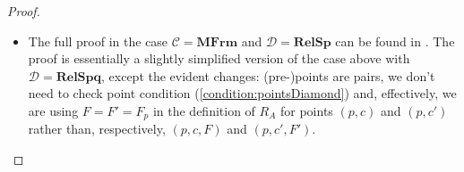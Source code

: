 \documentclass{article}[a4paper]
\theoremstyle{definition}
\newcommand{\Ccal}{\mathcal{C}} %
\newcommand{\Dcal}{\mathcal{D}} %
\newcommand{\relsp}{\mathbf{RelSp}}
\newcommand{\relspc}{\mathbf{RelSp^c}}
\newcommand{\relspq}{\mathbf{RelSpq}}
\newcommand{\mfrm}{\mathbf{MFrm}}
\DeclareMathOperator{\charop}{\nabla}
\begin{document}
\begin{proof}
\begin{itemize}
        Regarding the point condition (\ref{condition:pointsBox}), if $d \notin F'$, then $d \notin \charop(q_0)$ or  $d \notin F$. 
        If $d \notin \charop(q_0)$, then 
        $(q_0,e,G)$ provides the required witness.
        If $d \notin F$, then there is a point $(r,f,K)$ such that $(p,c,F) R_A (r,f,K)$ and $r(d) = 0$. 
        Then $r(c') \leq r(c) = 0$ and 
        $F' \subseteq F \subseteq \charop (r)$, so that $(p,c',F') R_A (r,f,K)$ and $(r,f,K)$ provides the witness.

        For the point condition (\ref{condition:pointsDiamond}), suppose $d \nleq c'$. Then $q_0 (d) = 1$ or $d \nleq c$. If $q_0 (d)=1$, then $(q_0,e,G)$ provides the required witness.
        If $d \nleq c$, then there is a point $(r,f,K)$ such that $(p,c,F) R_A (r,f,K)$ and $r(d) = 1$. 
        We then have $r(c')=0$ and $F' \subseteq \charop(r)$, so that 
        $(p,c',F') R_A (r,f,K)$ and $(r,f,K)$ provides the witness. 

        \item 
        The full proof in the case $\Ccal = \mfrm$ and $\Dcal = \relsp$ can be found in \cite{hil00}. The proof is essentially a slightly simplified version of the case above with $\Dcal = \relspq$, except the evident changes: (pre-)points are pairs, we don't need to check point condition (\ref{condition:pointsDiamond}) and, effectively, we are using $F=F'=F_p$ in the definition of $R_A$ for points $(p,c)$ and $(p,c')$ rather than, respectively, $(p,c,F)$ and $(p,c',F')$. 

    \end{itemize}
\end{proof}
\end{document}
